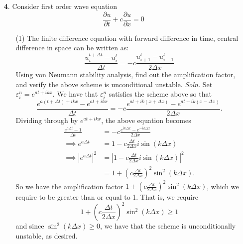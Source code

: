\documentclass{article}
\begin{document}
\begin{itemize}
    \item[\textbf{4}.] Consider first order wave equation
    \[\frac{\partial u}{\partial t} + c\frac{\partial u}{\partial x} = 0\]
    \begin{itemize}
        \item[(1)] The finite difference equation with forward difference in time, central difference in space can be written as:
        \[\frac{u_i^{t + \Delta t} - u_i^t}{\Delta t} = -c \frac{u_{i+1}^t - u_{i-1}^t}{2\Delta x}\]
        Using von Neumann stability analysis, find out the amplification factor, and verify the above scheme is unconditional unstable.
        \newline\newline
        \textit{Soln.} Set $\varepsilon_i^n = e^{at + ikx}$. We have that $\varepsilon_i^n$ satisfies the scheme above so that
        \[\frac{e^{a(t + \Delta t) + ikx} - e^{at + ikx}}{\Delta t} = -c\frac{e^{at + ik(x + \Delta x)} - e^{at + ik(x - \Delta x)}}{2\Delta x}.\]
        Dividing through by $e^{at + ikx}$, the above equation becomes
        \begin{align*}
            \frac{e^{a\Delta t} - 1}{\Delta t} &= -c\frac{e^{ik\Delta x} - e^{-ik\Delta x}}{2\Delta x}\\
            \implies e^{a\Delta t} &= 1 - c\frac{\Delta t}{2\Delta x}i\sin(k\Delta x)\\
            \implies \left|e^{a\Delta t}\right|^2 &= \left|1 - c\frac{\Delta t}{2\Delta x}i\sin(k \Delta x)\right|^2\\
            &= 1 + \left(c\frac{\Delta t}{2\Delta x}\right)^2\sin^2(k\Delta x).
        \end{align*}
        So we have the amplification factor $1 + \left(c\frac{\Delta t}{2\Delta x}\right)^2\sin^2(k\Delta x)$, which we require to be greater than or equal to 1. That is, we require
        \[1 + \left(c\frac{\Delta t}{2\Delta x}\right)^2\sin^2(k\Delta x) \geq 1\]
        and since $\sin^2(k\Delta x) \geq 0$, we have that the scheme is unconditionally unstable, as desired.
        \newline\newline


\end{itemize}
\end{itemize}
\end{document}
